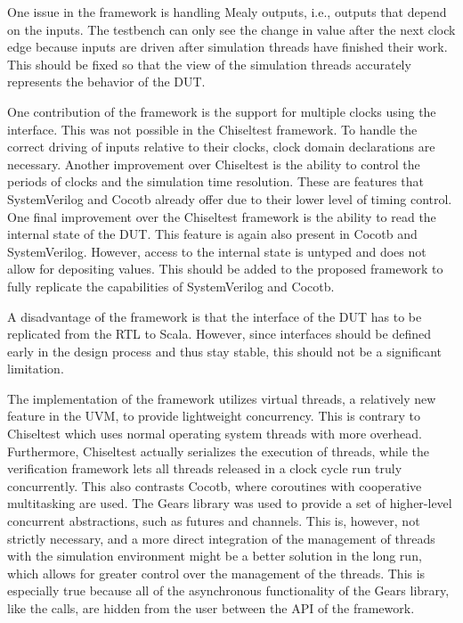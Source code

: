 One issue in the framework is handling Mealy outputs, i.e., outputs that depend on the inputs. The testbench can only see the change in value after the next clock edge because inputs are driven after simulation threads have finished their work. This should be fixed so that the view of the simulation threads accurately represents the behavior of the DUT.

One contribution of the framework is the support for multiple clocks using the  interface. This was not possible in the Chiseltest framework. To handle the correct driving of inputs relative to their clocks, clock domain declarations are necessary. Another improvement over Chiseltest is the ability to control the periods of clocks and the simulation time resolution. These are features that SystemVerilog and Cocotb already offer due to their lower level of timing control. One final improvement over the Chiseltest framework is the ability to read the internal state of the DUT. This feature is again also present in Cocotb and SystemVerilog. However, access to the internal state is untyped and does not allow for depositing values. This should be added to the proposed framework to fully replicate the capabilities of SystemVerilog and Cocotb.

A disadvantage of the framework is that the interface of the DUT has to be replicated from the RTL to Scala. However, since interfaces should be defined early in the design process and thus stay stable, this should not be a significant limitation.

The implementation of the framework utilizes virtual threads, a relatively new feature in the UVM, to provide lightweight concurrency. This is contrary to Chiseltest which uses normal operating system threads with more overhead. Furthermore, Chiseltest actually serializes the execution of threads, while the verification framework lets all threads released in a clock cycle run truly concurrently. This also contrasts Cocotb, where coroutines with cooperative multitasking are used. The Gears library was used to provide a set of higher-level concurrent abstractions, such as futures and channels. This is, however, not strictly necessary, and a more direct integration of the management of threads with the simulation environment might be a better solution in the long run, which allows for greater control over the management of the threads. This is especially true because all of the asynchronous functionality of the Gears library, like the  calls, are hidden from the user between the API of the framework.

